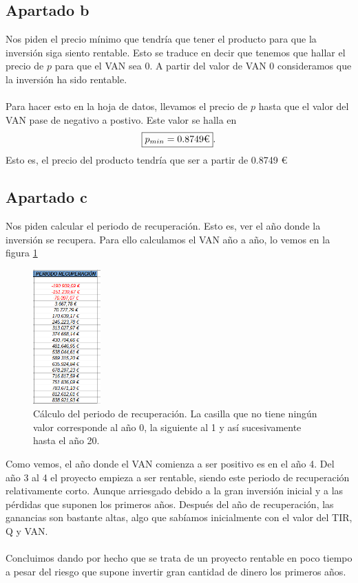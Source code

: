 \documentclass[11pt,letterpaper,onecolumn]{article}
\begin{document}
\subsection{Apartado b}
Nos piden el precio mínimo que tendría que tener el producto para que la inversión siga siento rentable. Esto se traduce en decir que tenemos que hallar el precio de $p$ para que el VAN sea 0. A partir del valor de VAN 0 consideramos que la inversión ha sido rentable. \\
\\
Para hacer esto en la hoja de datos, llevamos el precio de $p$ hasta que el valor del VAN pase de negativo a postivo. Este valor se halla en 
\[
	\boxed{p_{min}=0.8749 $€$}
.\] 
Esto es, el precio del producto tendría que ser a partir de 0.8749 €
\subsection{Apartado c}
Nos piden calcular el periodo de recuperación. Esto es, ver el año donde la inversión se recupera. Para ello calculamos el VAN año a año, lo vemos en la figura \ref{rec}
\begin{figure}[H]
	\centering
	\includegraphics[width=0.23\textwidth]{imagen/ej1_rec.PNG}
	\caption{Cálculo del periodo de recuperación. La casilla que no tiene ningún valor corresponde al año 0, la siguiente al 1 y así sucesivamente hasta el año 20.}
	\label{rec}
\end{figure}
\newpage
\vspace{8cm}
Como vemos, el año donde el VAN comienza a ser positivo es en el año 4. Del año 3 al 4 el proyecto empieza a ser rentable, siendo este periodo de recuperación relativamente corto. Aunque arriesgado debido a la gran inversión inicial y a las pérdidas que suponen los primeros años. Después del año de recuperación, las ganancias son bastante altas, algo que sabíamos inicialmente con el valor del TIR, Q y VAN. \\
\\
Concluimos dando por hecho que se trata de un proyecto rentable en poco tiempo a pesar del riesgo que supone invertir gran cantidad de dinero los primeros años. 
\end{document}

